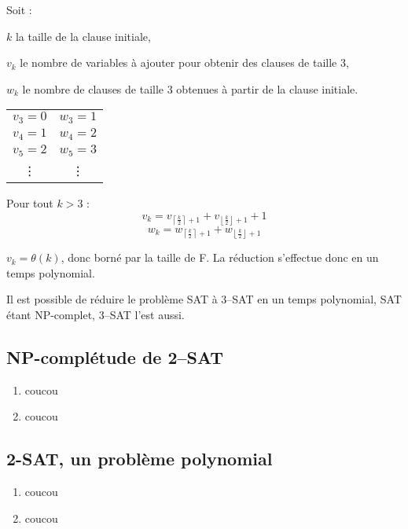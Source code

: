 \begin{enumerate}[(a)]
Soit :
\begin{description}
\item $k$ la taille de la clause initiale,
\item $v_k$ le nombre de variables à ajouter pour obtenir des clauses de taille 3,
\item $w_k$ le nombre de clauses de taille 3 obtenues à partir de la clause initiale.
\end{description}
\begin{center}
\begin{tabular}{c c}
$v_3 = 0$ & $w_3 = 1$ \\
$v_4 = 1$ & $w_4 = 2$ \\
$v_5 = 2$ & $w_5 = 3$ \\
\vdots & \vdots
\end{tabular}
\end{center}

Pour tout $k > 3$ :
\[ v_k = v_{\left \lceil \frac{k}{2} \right \rceil + 1} + v_{\left \lfloor \frac{k}{2} \right \rfloor + 1} + 1 \]
\[ w_k = w_{\left \lceil \frac{k}{2} \right \rceil + 1} + w_{\left \lfloor \frac{k}{2} \right \rfloor + 1} \]

$v_k = \theta(k)$, donc borné par la taille de F. La réduction s'effectue donc en un temps polynomial.

Il est possible de réduire le problème SAT à 3--SAT en un temps polynomial, SAT étant NP-complet, 3--SAT l'est aussi.
\end{enumerate}

\subsection{NP-complétude de 2--SAT}
\begin{enumerate}
\item coucou
\item coucou
\end{enumerate}

\subsection{2-SAT, un problème polynomial}
\begin{enumerate}
\item coucou
\item coucou
\end{enumerate}
